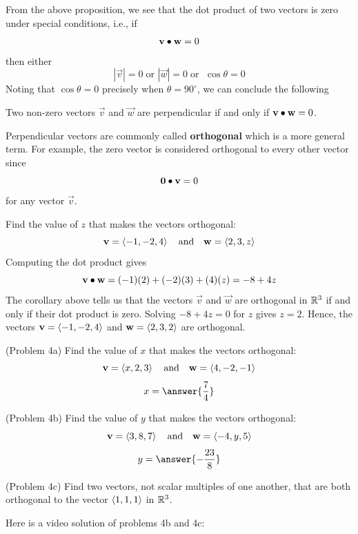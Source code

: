 \documentclass[handout]{ximera}
\begin{document}
From the above proposition, we see that the dot product of two vectors is zero under special conditions, i.e.,  if 
\[
\mathbf{v} \bullet \mathbf{w} = 0
\]
then either
\[
|\vec{v}| = 0 \; \text{or } |\vec{w}| = 0 \; \text{or } \; \cos \theta = 0
\]
Noting that $\cos \theta = 0$ precisely when $\theta = 90^\circ$, we can conclude the following

\begin{corollary} 
Two non-zero vectors $\vec{v}$ and $\vec{w}$ are perpendicular if and only if $\mathbf{v} \bullet \mathbf{w} = 0$.
\end{corollary}

Perpendicular vectors are commonly called \textbf{orthogonal} which is a more general term. 
For example, the zero vector is considered orthogonal to every other vector since
\[
\mathbf 0 \bullet \mathbf v = 0
\]
for any vector $\vec v$.

\begin{example}[Example 4]
Find the value of $z$ that makes the vectors orthogonal:
\[
\mathbf v = \left\langle -1,-2, 4\right\rangle \quad \text{and} \quad \mathbf w = \left\langle 2,3, z\right\rangle
\]
Computing the dot product gives
\[
\mathbf v \bullet \mathbf w = (-1)(2) + (-2)(3) + (4)(z) = -8+4z
\]
The corollary above tells us that the vectors $\vec v$ and $\vec w$ are orthogonal in $\mathbb R^3$ if and only if their 
dot product is zero. Solving $-8 + 4z = 0$ for $z$
gives $z = 2$. Hence, the vectors $\mathbf v = \left\langle -1,-2, 4\right\rangle$ and $\mathbf w = \left\langle 2,3, 2\right\rangle$ are orthogonal.
\end{example}

\begin{problem}(Problem 4a) 
Find the value of $x$ that makes the vectors orthogonal:
\[
\mathbf v = \left\langle x,2, 3\right\rangle \quad \text{and} \quad \mathbf w = \left\langle 4,-2, -1\right\rangle
\]
\[
x = \answer{\frac{7}{4}}
\]
\end{problem}

\begin{problem}(Problem 4b) 
Find the value of $y$ that makes the vectors orthogonal:
\[
\mathbf v = \left\langle 3,8, 7\right\rangle \quad \text{and} \quad \mathbf w = \left\langle -4,y, 5\right\rangle
\]
\[
y = \answer{-\frac{23}{8}}
\]
\end{problem}

\begin{problem}(Problem 4c) Find two vectors, not scalar multiples of one another, that are both orthogonal to the 
vector $\left\langle 1,1,1\right\rangle$ in $\mathbb R^3$.
\end{problem}


Here is a video solution of problems 4b and 4c:\\
\begin{foldable}
\end{foldable}
\end{document}
